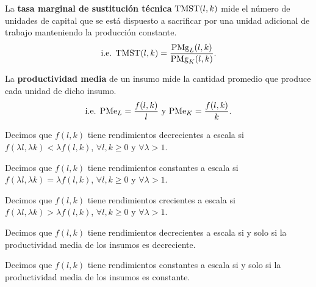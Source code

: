 \documentclass[8pt,a4paper]{extarticle}
\begin{document}
\begin{multicols}{3}
\begin{boxdef}
	La \textbf{tasa marginal de sustitución técnica} $\text{\normalfont TMST} (l, k) $ mide el número de unidades de capital que se está dispuesto a sacrificar por una unidad adicional de trabajo manteniendo la producción constante.
	\[
		\text{\normalfont i.e. TMST}(l,k) = \frac{\text{\normalfont PMg}_L (l, k)}{\text{\normalfont PMg}_K (l, k)}
	.\] 
\end{boxdef}

\begin{boxdef}
	La \textbf{productividad media} de un insumo mide la cantidad promedio que produce cada unidad de dicho insumo.
	\[
		\text{\normalfont i.e. PMe}_L = \frac{f (l, k)}{l}\ \text{y } \text{\normalfont PMe}_K = \frac{f (l, k)}{k}
	.\] 
\end{boxdef}

\begin{boxtheo}
	Decimos que $f(l, k)$ tiene rendimientos decrecientes a escala si $f(\lambda l, \lambda k) < \lambda f(l, k)$,\; $\forall l, k \ge 0$ y $\forall \lambda > 1$.
\end{boxtheo}

\begin{boxtheo}
	Decimos que $f(l, k)$ tiene rendimientos constantes a escala si $f(\lambda l, \lambda k) = \lambda f(l, k)$,\; $\forall l, k \ge 0$ y $\forall \lambda > 1$.
\end{boxtheo}

\begin{boxtheo}
	Decimos que $f(l, k)$ tiene rendimientos crecientes a escala si $f(\lambda l, \lambda k) > \lambda f(l, k)$,\; $\forall l, k \ge 0$ y $\forall \lambda > 1$.
\end{boxtheo}

\begin{boxprop}
	Decimos que $f(l, k)$ tiene rendimientos decrecientes a escala si y solo si la productividad media de los insumos es decreciente.
\end{boxprop}

\begin{boxprop}                                                                                                                                  
    Decimos que $f(l, k)$ tiene rendimientos constantes a escala si y solo si la productividad media de los insumos es constante.        
\end{boxprop}


\end{multicols}
\end{document}
